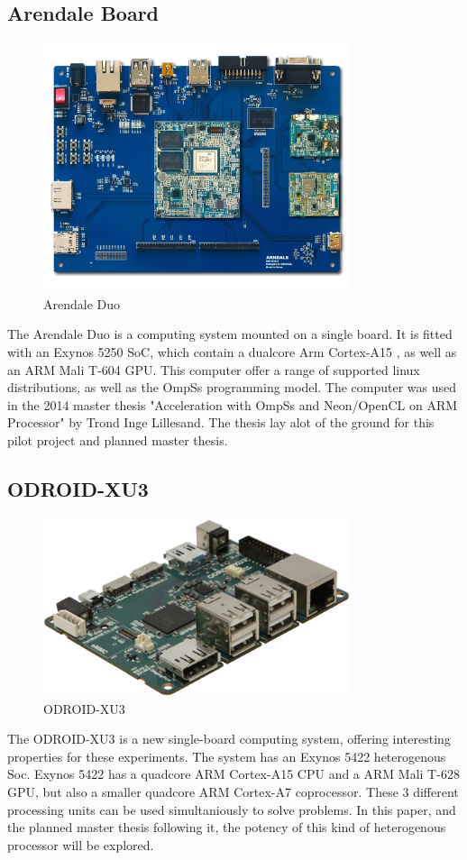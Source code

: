 \subsection{Arendale Board} \label{ArendaleBoard}
\begin{figure}[ht!]
  \centering
  \includegraphics[width=90mm]{fig/Arendale.jpg}
  \caption{Arendale Duo \label{overflow}}
\end{figure}
The Arendale Duo is a computing system mounted on a single board.
It is fitted with an Exynos 5250 SoC, which contain a dualcore Arm Cortex-A15 , as well as an ARM Mali T-604 GPU.
This computer offer a range of supported linux distributions, as well as the OmpSs programming model.
The computer was used in the 2014 master thesis "Acceleration with OmpSs and Neon/OpenCL on ARM Processor" by Trond Inge Lillesand.
The thesis lay alot of the ground for this pilot project and planned master thesis.

\subsection{ODROID-XU3} \label{OdroidXU3}
\begin{figure}[ht!]
  \centering
  \includegraphics[width=90mm]{fig/ODROID.jpg}
  \caption{ODROID-XU3 \label{overflow}}
\end{figure}
The ODROID-XU3 is a new single-board computing system, offering interesting properties for these experiments.
The system has an Exynos 5422 heterogenous Soc.
Exynos 5422 has a quadcore ARM Cortex-A15 CPU and a ARM Mali T-628 GPU, but also a smaller quadcore ARM Cortex-A7 coprocessor.
These 3 different processing units can be used simultaniously to solve problems.
In this paper, and the planned master thesis following it, the potency of this kind of heterogenous processor will be explored.

